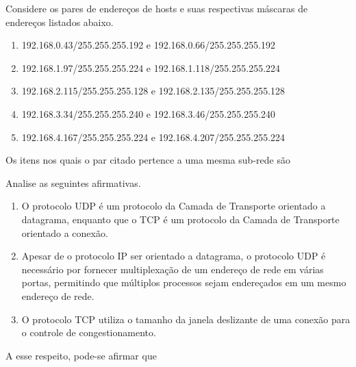 %
{
\def\AMCbeginQuestion#1#2{\par\noindent{\bf (POSCOMP 2007 - Questão 66)}}
\begin{question}{} Considere os pares de endereços de hosts e suas respectivas máscaras de endereços listados abaixo.
\begin{enumerate}[label=\Roman*.]
\item 192.168.0.43/255.255.255.192 e 192.168.0.66/255.255.255.192
\item 192.168.1.97/255.255.255.224 e 192.168.1.118/255.255.255.224
\item 192.168.2.115/255.255.255.128 e 192.168.2.135/255.255.255.128
\item 192.168.3.34/255.255.255.240 e 192.168.3.46/255.255.255.240
\item 192.168.4.167/255.255.255.224 e 192.168.4.207/255.255.255.224
\end{enumerate}
Os itens nos quais o par citado pertence a uma mesma sub-rede são
\begin{choices}
\end{choices}
\end{question}
}
%
{
\def\AMCbeginQuestion#1#2{\par\noindent{\bf (POSCOMP 2007 - Questão 67)}}
\begin{question}{} Analise as seguintes afirmativas.
\begin{enumerate}[label=\Roman*.]
\item O protocolo UDP é um protocolo da Camada de Transporte orientado a datagrama, enquanto que o TCP é um protocolo da Camada de Transporte orientado a conexão.
\item Apesar de o protocolo IP ser orientado a datagrama, o protocolo UDP é necessário por fornecer multiplexação de um endereço de rede em várias portas, permitindo que múltiplos processos sejam endereçados em um mesmo endereço de rede.
\item O protocolo TCP utiliza o tamanho da janela deslizante de uma conexão para o controle de congestionamento.
\end{enumerate}
A esse respeito, pode-se afirmar que
\begin{choices}
\end{choices}
\end{question}
}
